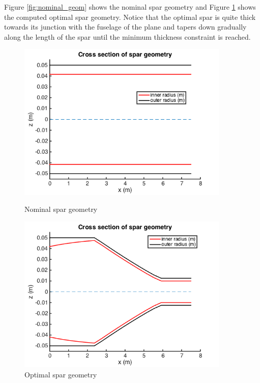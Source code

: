 \documentclass[10pt]{article}
\begin{document}
Figure \ref{fig:nominal_geom} shows the nominal spar geometry
and Figure \ref{fig:optimal_geom} shows the computed optimal spar
geometry. Notice that the optimal spar is quite thick towards
its junction with the fuselage of the plane and tapers down
gradually along the length of the spar until the minimum
thickness constraint is reached.
%
\begin{figure}[hbt!]
\centering
\begin{minipage}[b]{0.4\textwidth}
\includegraphics[width=0.9\textwidth]{nominal_geom}
\caption{Nominal spar geometry}
\label{fig:nominal_geom}
\end{minipage}
\begin{minipage}[b]{0.4\textwidth}
\includegraphics[width=0.9\textwidth]{optimal_geom}
\caption{Optimal spar geometry}
\label{fig:optimal_geom}
\end{minipage}
\end{figure}
\end{document}
